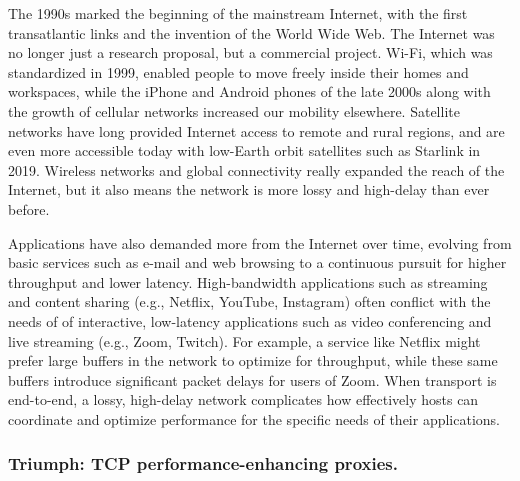 The 1990s marked the beginning of the mainstream Internet, with the first
transatlantic links and the invention of the World Wide Web. The Internet was
no longer just a research proposal, but a commercial project. Wi-Fi, which was
standardized in 1999, enabled people to move freely inside their homes and
workspaces, while the iPhone and Android phones of the late 2000s along with
the growth of cellular networks increased our mobility elsewhere. Satellite
networks have long provided Internet access to remote and rural regions, and
are even more accessible today with low-Earth orbit satellites such as Starlink
in 2019. Wireless networks and global connectivity really expanded the reach of
the Internet, but it also means the network is more lossy and high-delay than
ever before.

Applications have also demanded more from the Internet over time, evolving from
basic services such as e-mail and web browsing to a continuous pursuit for
higher throughput and lower latency. High-bandwidth applications such as
streaming and content sharing (e.g., Netflix, YouTube, Instagram) often
conflict with the needs of of interactive, low-latency applications such as
video conferencing and live streaming (e.g., Zoom, Twitch). For example, a
service like Netflix might prefer large buffers in the network to optimize for
throughput, while these same buffers introduce significant packet delays for
users of Zoom. When transport is end-to-end, a lossy, high-delay network
complicates how effectively hosts can coordinate and optimize performance for
the specific needs of their applications.

\subsubsection{Triumph: TCP performance-enhancing proxies.}




